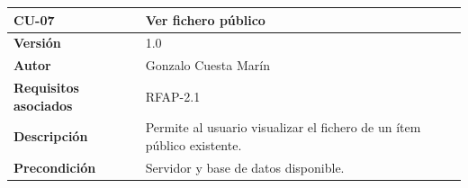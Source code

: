 \documentclass[
]{article}
\begin{document}
\begin{longtable}[]{@{}ll@{}}
\toprule
\begin{minipage}[b]{0.23\columnwidth}\raggedright
\textbf{CU-07}\strut
\end{minipage} & \begin{minipage}[b]{0.71\columnwidth}\raggedright
\textbf{Ver fichero público}\strut
\end{minipage}\tabularnewline
\midrule
\endhead
\begin{minipage}[t]{0.23\columnwidth}\raggedright
\textbf{Versión}\strut
\end{minipage} & \begin{minipage}[t]{0.71\columnwidth}\raggedright
1.0\strut
\end{minipage}\tabularnewline
\begin{minipage}[t]{0.23\columnwidth}\raggedright
\textbf{Autor}\strut
\end{minipage} & \begin{minipage}[t]{0.71\columnwidth}\raggedright
Gonzalo Cuesta Marín\strut
\end{minipage}\tabularnewline
\begin{minipage}[t]{0.23\columnwidth}\raggedright
\textbf{Requisitos asociados}\strut
\end{minipage} & \begin{minipage}[t]{0.71\columnwidth}\raggedright
RFAP-2.1\strut
\end{minipage}\tabularnewline
\begin{minipage}[t]{0.23\columnwidth}\raggedright
\textbf{Descripción}\strut
\end{minipage} & \begin{minipage}[t]{0.71\columnwidth}\raggedright
Permite al usuario visualizar el fichero de un ítem público
existente.\strut
\end{minipage}\tabularnewline
\begin{minipage}[t]{0.23\columnwidth}\raggedright
\textbf{Precondición}\strut
\end{minipage} & \begin{minipage}[t]{0.71\columnwidth}\raggedright
Servidor y base de datos disponible.


\end{minipage}
\end{longtable}
\end{document}
